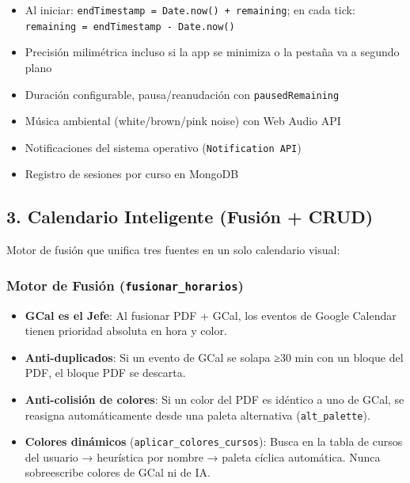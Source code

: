 \documentclass[
  spanish,
  11pt,
  a4paper,
]{article}
\providecommand{\tightlist}{%
  \setlength{\itemsep}{0pt}\setlength{\parskip}{0pt}}
\begin{document}
\begin{itemize}
\tightlist
\item
  Al iniciar: \texttt{endTimestamp\ =\ Date.now()\ +\ remaining}; en
  cada tick: \texttt{remaining\ =\ endTimestamp\ -\ Date.now()}
\item
  Precisión milimétrica incluso si la app se minimiza o la pestaña va a
  segundo plano
\item
  Duración configurable, pausa/reanudación con \texttt{pausedRemaining}
\item
  Música ambiental (white/brown/pink noise) con Web Audio API
\item
  Notificaciones del sistema operativo (\texttt{Notification\ API})
\item
  Registro de sesiones por curso en MongoDB
\end{itemize}

\subsection{3. Calendario Inteligente (Fusión +
CRUD)}\label{calendario-inteligente-fusiuxf3n-crud}

Motor de fusión que unifica tres fuentes en un solo calendario visual:

\subsubsection{\texorpdfstring{Motor de Fusión
(\texttt{fusionar\_horarios})}{Motor de Fusión (fusionar\_horarios)}}\label{motor-de-fusiuxf3n-fusionar_horarios}

\begin{itemize}
\tightlist
\item
  \textbf{GCal es el Jefe}: Al fusionar PDF + GCal, los eventos de
  Google Calendar tienen prioridad absoluta en hora y color.
\item
  \textbf{Anti-duplicados}: Si un evento de GCal se solapa ≥30 min con
  un bloque del PDF, el bloque PDF se descarta.
\item
  \textbf{Anti-colisión de colores}: Si un color del PDF es idéntico a
  uno de GCal, se reasigna automáticamente desde una paleta alternativa
  (\texttt{alt\_palette}).
\item
  \textbf{Colores dinámicos} (\texttt{aplicar\_colores\_cursos}): Busca
  en la tabla de cursos del usuario → heurística por nombre → paleta
  cíclica automática. Nunca sobreescribe colores de GCal ni de IA.
\end{itemize}
\end{document}
